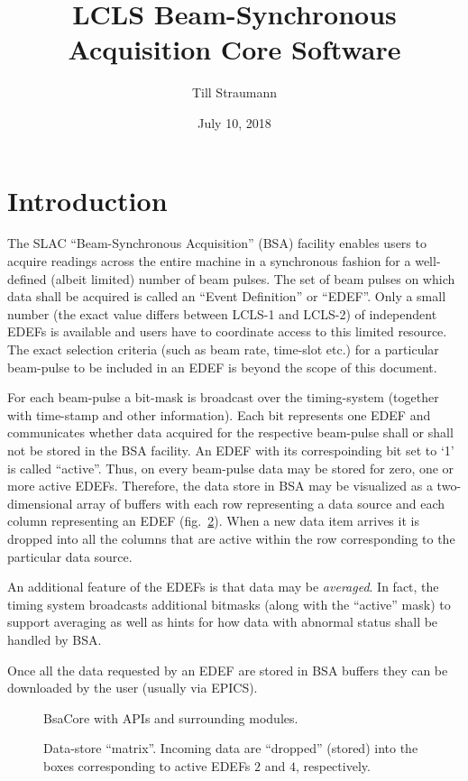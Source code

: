 \documentclass[11pt]{article}
\title{LCLS Beam-Synchronous Acquisition Core Software}
\author{Till Straumann}
\date{July 10, 2018}
\newcommand{\bsac}{BsaCore}
\newcommand{\bsa} {BSA}
\newcommand{\slac}{SLAC}
\newcommand{\EDEF}{EDEF}
\newcounter{figs}
\newcommand{\fig}[3][0]{
\refstepcounter{figs}
\hfill\resizebox{#2}{!}{
        \rotatebox{#1}{\texttt{[image: \#3]}}}\hspace*{\fill}
}
\begin{document}
\maketitle
\section{Introduction}
The \slac{} ``Beam-Synchronous Acquisition'' (\bsa) facility enables users to acquire
readings across the entire machine in a synchronous fashion for a well-defined (albeit
limited) number of beam pulses. The set of beam pulses on which data shall be acquired
is called an ``Event Definition'' or ``{\EDEF}''. Only a small number (the exact value differs
between LCLS-1 and LCLS-2) of independent \EDEF{}s is available and users have to
coordinate access to this limited resource. The exact selection criteria (such as
beam rate, time-slot etc.) for a particular beam-pulse to be included in an \EDEF{} is beyond
the scope of this document.

For each beam-pulse a bit-mask is broadcast over the timing-system (together with time-stamp
and other information). Each bit represents one \EDEF{} and communicates whether data acquired
for the respective beam-pulse shall or shall not be stored in the \bsa{} facility. An \EDEF{} 
with its correspoinding bit set to `1' is called ``active''. Thus,
on every beam-pulse data may be stored for zero, one or more active \EDEF{}s. Therefore, the data
store in \bsa{} may be visualized as a two-dimensional array of buffers with each row
representing a data source and each column representing an \EDEF{} (fig.~\ref{fig:edefmat}). When a new data item
arrives it is dropped into all the columns that are active within the row corresponding
to the particular data source.

An additional feature of the \EDEF{}s is that data may be {\em averaged}. In fact, the 
timing system broadcasts additional bitmasks (along with the ``active'' mask) to support
averaging as well as hints for how data with abnormal status shall be handled by \bsa.

Once all the data requested by an \EDEF{} are stored in \bsa{} buffers they can be downloaded
by the user (usually via EPICS).

\begin{figure}
\fig{0.5\textwidth}{fig_blkdiag.eps}
\label{fig:bdiag}
\caption{\bsac{} with APIs and surrounding modules.}
\end{figure}

\begin{figure}
\fig{0.5\textwidth}{fig_edefmat.eps}
\label{fig:edefmat}
\caption{Data-store ``matrix''. Incoming data are ``dropped'' (stored) into the boxes corresponding to active EDEFs $2$ and $4$, respectively.}
\end{figure}
\end{document}
